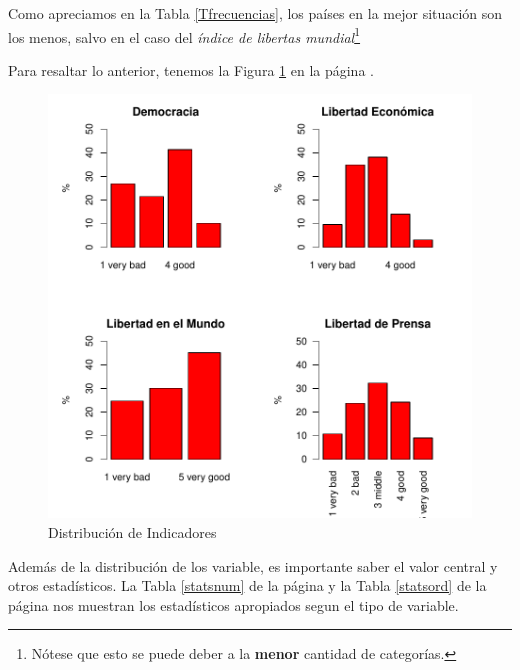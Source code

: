 \documentclass{article}
\begin{document}
Como apreciamos en la Tabla \ref{Tfrecuencias}, los países en la mejor situación son los menos, salvo en el caso del \emph{índice de libertas mundial}\footnote{Nótese que esto se puede deber a la {\bf menor} cantidad de categorías.}

\clearpage

Para resaltar lo anterior, tenemos la Figura \ref{barplots} en la página \pageref{barplots}. 


\begin{figure}[h]
\centering
\includegraphics{paperVersion_6-barplots}
\caption{Distribución de Indicadores}
\label{barplots}
\end{figure}

Además de la distribución de los variable, es importante saber el valor central y otros estadísticos. La Tabla \ref{statsnum} de la página \pageref{statsnum} y la Tabla \ref{statsord} de la página \pageref{statsord} nos muestran los estadísticos apropiados segun el tipo de variable.
\end{document}

